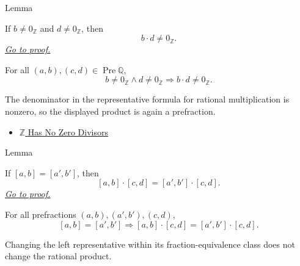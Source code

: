 \begin{lemmabox}{Lemma}
\begin{lemma}
\label{lem:multiplication-denominator-nonzero-q}
If $b\ne 0_{\mathbb{Z}}$ and $d\ne 0_{\mathbb{Z}}$, then
\[
b\cdot d\ne 0_{\mathbb{Z}}.
\]
\hyperref[prf:multiplication-denominator-nonzero-q]{\textit{Go to proof.}}
\end{lemma}
\end{lemmabox}

\begin{remark*}
For all $(a,b),(c,d)\in\operatorname{Pre}\mathbb{Q}$,
\[
b\ne 0_{\mathbb{Z}}\land d\ne 0_{\mathbb{Z}}
\Longrightarrow b\cdot d\ne 0_{\mathbb{Z}}.
\]
\end{remark*}

\begin{remark*}[Interpretation]
The denominator in the representative formula for rational multiplication is
nonzero, so the displayed product is again a prefraction.
\end{remark*}

\begin{dependencies}
\begin{itemize}
  \item \hyperref[thm:z-has-no-zero-divisors]{$\mathbb{Z}$ Has No Zero Divisors}
\end{itemize}
\end{dependencies}

\begin{lemmabox}{Lemma}
\begin{lemma}
\label{lem:multiplication-on-q-respects-left-equivalence}
If $[a,b]=[a',b']$, then
\[
[a,b]\cdot[c,d]=[a',b']\cdot[c,d].
\]
\hyperref[prf:multiplication-on-q-respects-left-equivalence]{\textit{Go to proof.}}
\end{lemma}
\end{lemmabox}

\begin{remark*}
For all prefractions $(a,b),(a',b'),(c,d)$,
\[
[a,b]=[a',b']
\Longrightarrow
[a,b]\cdot[c,d]=[a',b']\cdot[c,d].
\]
\end{remark*}

\begin{remark*}[Interpretation]
Changing the left representative within its fraction-equivalence class does
not change the rational product.
\end{remark*}

